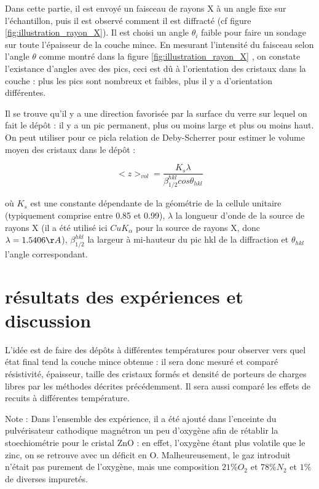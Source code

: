 \documentclass[a4paper,12pt,oneside]{article}
\def \be {\begin{equation}}
\def \ee {\end{equation}}
\begin{document}
Dans cette partie, il est envoyé un faisceau de rayons X à un angle fixe sur l'échantillon, puis il est observé comment il est diffracté (cf figure \ref{fig:illustration_rayon_X}). Il est choisi un angle $\theta_i$ faible pour faire un sondage sur toute l'épaisseur de la couche mince. En mesurant l'intensité du faisceau selon l'angle $\theta$ comme montré dans la figure \ref{fig:illustration_rayon_X} , on constate l'existance d'angles avec des pics, ceci est dû à l'orientation des cristaux dans la couche : plus les pics sont nombreux et faibles, plus il y a d'orientation différentes.

Il se trouve qu'il y a une direction favorisée par la surface du verre sur lequel on fait le dépôt : il y a un pic permanent, plus ou moins large et plus ou moins haut. On peut utiliser pour ce picla relation de Deby-Scherrer pour estimer le volume moyen des cristaux dans le dépôt :

\be
	<z>_{vol}=\frac{K_s\lambda}{\beta^{hkl}_{1/2} cos\theta_{hkl}}
\ee

où $K_s$ est une constante dépendante de la géométrie de la cellule unitaire (typiquement comprise entre 0.85 et 0.99), $\lambda$ la longueur d'onde de la source de rayons X (il a été utilisé ici $Cu K_{\alpha}$ pour la source de rayons X, donc $\lambda = 1.5406 \AA$), $\beta^{hkl}_{1/2}$ la largeur à mi-hauteur du pic hkl de la diffraction et $\theta_{hkl}$ l'angle correspondant.



\section{résultats des expériences et discussion}

L'idée est de faire des dépôts à différentes températures pour observer vers quel état final tend la couche mince obtenue : il sera donc mesuré et comparé résistivité, épaisseur, taille des cristaux formés et densité de porteurs de charges libres par les méthodes décrites précédemment. Il sera aussi comparé les effets de recuits à différentes température.

Note : Dans l'ensemble des expérience, il a été ajouté dans l'enceinte du pulvérisateur cathodique magnétron un peu d'oxygène afin de rétablir la stoechiométrie pour le cristal ZnO : en effet, l'oxygène étant plus volatile que le zinc, on se retrouve avec un déficit en O. Malheureusement, le gaz introduit n'était pas purement de l'oxygène, mais une composition $21 \% O_2 $ et $78 \% N_2 $ et $1 \% $ de diverses impuretés.
\end{document}
